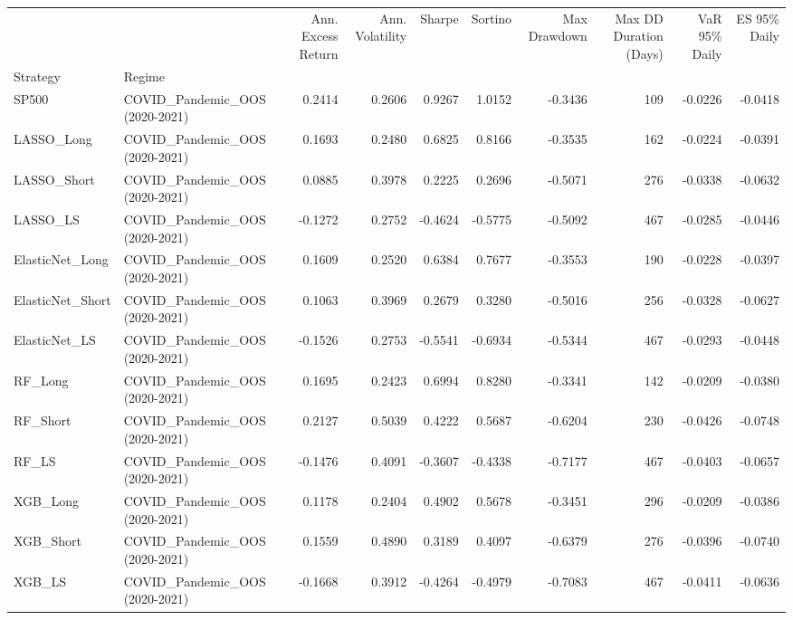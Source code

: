 \begin{tabular}{llrrrrrrrr}
\toprule
 &  & Ann. Excess Return & Ann. Volatility & Sharpe & Sortino & Max Drawdown & Max DD Duration (Days) & VaR 95\% Daily & ES 95\% Daily \\
Strategy & Regime &  &  &  &  &  &  &  &  \\
\midrule
SP500 & COVID\_Pandemic\_OOS (2020-2021) & 0.2414 & 0.2606 & 0.9267 & 1.0152 & -0.3436 & 109 & -0.0226 & -0.0418 \\
\cline{1-10}
LASSO\_Long & COVID\_Pandemic\_OOS (2020-2021) & 0.1693 & 0.2480 & 0.6825 & 0.8166 & -0.3535 & 162 & -0.0224 & -0.0391 \\
\cline{1-10}
LASSO\_Short & COVID\_Pandemic\_OOS (2020-2021) & 0.0885 & 0.3978 & 0.2225 & 0.2696 & -0.5071 & 276 & -0.0338 & -0.0632 \\
\cline{1-10}
LASSO\_LS & COVID\_Pandemic\_OOS (2020-2021) & -0.1272 & 0.2752 & -0.4624 & -0.5775 & -0.5092 & 467 & -0.0285 & -0.0446 \\
\cline{1-10}
ElasticNet\_Long & COVID\_Pandemic\_OOS (2020-2021) & 0.1609 & 0.2520 & 0.6384 & 0.7677 & -0.3553 & 190 & -0.0228 & -0.0397 \\
\cline{1-10}
ElasticNet\_Short & COVID\_Pandemic\_OOS (2020-2021) & 0.1063 & 0.3969 & 0.2679 & 0.3280 & -0.5016 & 256 & -0.0328 & -0.0627 \\
\cline{1-10}
ElasticNet\_LS & COVID\_Pandemic\_OOS (2020-2021) & -0.1526 & 0.2753 & -0.5541 & -0.6934 & -0.5344 & 467 & -0.0293 & -0.0448 \\
\cline{1-10}
RF\_Long & COVID\_Pandemic\_OOS (2020-2021) & 0.1695 & 0.2423 & 0.6994 & 0.8280 & -0.3341 & 142 & -0.0209 & -0.0380 \\
\cline{1-10}
RF\_Short & COVID\_Pandemic\_OOS (2020-2021) & 0.2127 & 0.5039 & 0.4222 & 0.5687 & -0.6204 & 230 & -0.0426 & -0.0748 \\
\cline{1-10}
RF\_LS & COVID\_Pandemic\_OOS (2020-2021) & -0.1476 & 0.4091 & -0.3607 & -0.4338 & -0.7177 & 467 & -0.0403 & -0.0657 \\
\cline{1-10}
XGB\_Long & COVID\_Pandemic\_OOS (2020-2021) & 0.1178 & 0.2404 & 0.4902 & 0.5678 & -0.3451 & 296 & -0.0209 & -0.0386 \\
\cline{1-10}
XGB\_Short & COVID\_Pandemic\_OOS (2020-2021) & 0.1559 & 0.4890 & 0.3189 & 0.4097 & -0.6379 & 276 & -0.0396 & -0.0740 \\
\cline{1-10}
XGB\_LS & COVID\_Pandemic\_OOS (2020-2021) & -0.1668 & 0.3912 & -0.4264 & -0.4979 & -0.7083 & 467 & -0.0411 & -0.0636 \\

\end{tabular}
